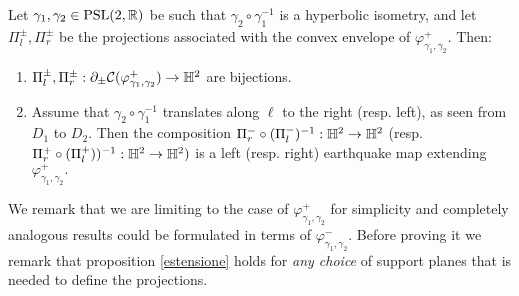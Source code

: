 \begin{proposition}\label{estensione}
    Let $\gamma_1,\gamma_2 \in \text{PSL}(2,\mathbb{R})$ be such that $\gamma_2\circ\gamma_1^{-1}$ is a hyperbolic isometry, and let $\Pi_l^\pm, \Pi_r^\pm$ be the projections associated with the convex envelope of $\varphi_{\gamma_1,\gamma_2}^+.$ Then:
    \begin{enumerate}
        \item $\Pi_l^\pm, \Pi_r^\pm:\partial_\pm\mathcal{C}(\varphi_{\gamma_1,\gamma_2}^+)\to\mathbb{H}^2$ are bijections.
        \item Assume that $\gamma_2\circ\gamma_1^{-1}$ translates along $\ell$ to the right (resp. left), as seen from $D_1$ to $D_2.$ Then the composition $\Pi_r^-\circ(\Pi_l^-)^{-1}:\mathbb{H}^2\to\mathbb{H}^2$ (resp. $\Pi_r^+\circ(\Pi_l^+))^{-1}:\mathbb{H}^2\to\mathbb{H}^2)$ is a left (resp. right) earthquake map extending $\varphi_{\gamma_1,\gamma_2}^+.$
    \end{enumerate} 
\end{proposition}

We remark that we are limiting to the case of $\varphi_{\gamma_1,\gamma_2}^+$ for simplicity and completely analogous results could be formulated in terms of $\varphi_{\gamma_1,\gamma_2}^-.$ Before proving it we remark that proposition \ref{estensione} holds for \textit{any choice}  of support planes that is needed to define the projections.

